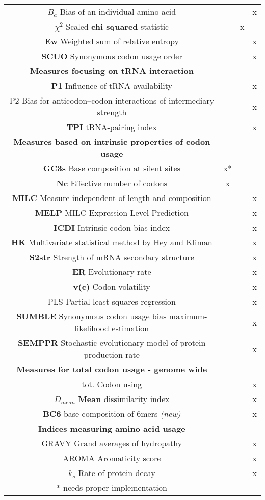 \begin{table}[tb]
\begin{footnotesize}
\begin{tabular}{cccc}
	$B_a$ Bias of an individual amino acid	& & & x	 \\
	$\chi^2$ Scaled \textbf{chi squared} statistic		& & x &	 \\
	\textbf{Ew}	Weighted sum of relative entropy	& & & x	 \\
	\textbf{SCUO}	 Synonymous codon usage order	& & & x	 \\
\midrule	
\textbf{Measures focusing on tRNA interaction} \\
	\textbf{P1}	Influence of tRNA availability	& & & x	 \\
	P2	Bias for anticodon–codon interactions of intermediary strength	& & & x	 \\
	\textbf{TPI}	tRNA-pairing index	& & & x	 \\
\midrule	
\textbf{Measures based on intrinsic properties of codon usage} \\
	\textbf{GC3s}	 Base composition at silent sites	& x* & &	 \\
	\textbf{Nc}	Effective number of codons	& x & &	 \\
	\textbf{MILC}	 Measure independent of length and composition	& & & x	 \\
	\textbf{MELP}	 MILC Expression Level Prediction	& & & x	 \\
	\textbf{ICDI}	 Intrinsic codon bias index	& & & x	 \\
	\textbf{HK}	Multivariate statistical method by Hey and Kliman	& & & x	 \\
	\textbf{S2str} Strength of mRNA secondary structure	& & & x	 \\
	\textbf{ER}	Evolutionary rate	& & & x	 \\
	\textbf{v(c)}	 Codon volatility	& & & x	 \\
	PLS	Partial least squares regression	& & & x	 \\
	\textbf{SUMBLE}	Synonymous codon usage bias maximum-likelihood estimation	& & & x	 \\
	\textbf{SEMPPR}	Stochastic evolutionary model of protein production rate	& & & x	 \\
	\midrule	
\textbf{Measures for total codon usage - genome wide} \\
	tot. Codon using		& & & x	 \\
	$D_{mean}$	\textbf{Mean} dissimilarity index 	& & & x	 \\
	\textbf{BC6}  base composition of 6mers \textit{(new)} 	& & & x	 \\
		\midrule	
\textbf{Indices measuring amino acid usage} \\
	GRAVY	Grand averages of hydropathy	& & & x	 \\
	AROMA	Aromaticity score	& & & x	 \\
	$k_s$	Rate of protein decay	& & & x	 \\
\bottomrule 

* needs proper implementation
\end{tabular}
\end{footnotesize}
\end{table}

